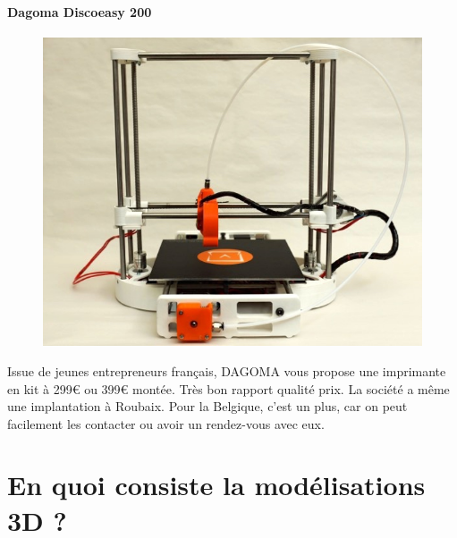 \documentclass{article}
\begin{document}
\paragraph{Dagoma Discoeasy 200} \hfill \break
\begin{figure}[h!]
\centering
\includegraphics[scale=0.4]{./images/dagoma.png}
\end{figure}\hfill \break
Issue de jeunes entrepreneurs français, DAGOMA vous propose une imprimante en kit à 299\euro{} ou 399\euro{} montée. Très bon rapport qualité prix. La société a même une implantation à Roubaix. Pour la Belgique, c'est un plus, car on peut facilement les contacter ou avoir un rendez-vous avec eux.
\newpage
\section{En quoi consiste la modélisations 3D ?}
\end{document}
